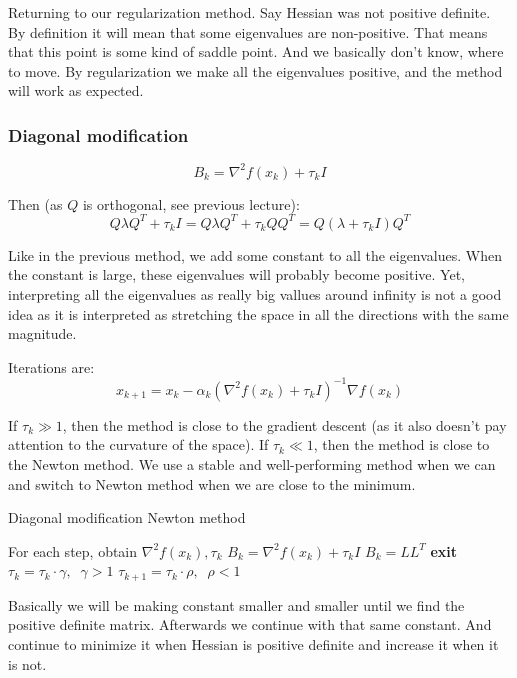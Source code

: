 Returning to our regularization method. Say Hessian was not positive definite. By definition it will mean that some eigenvalues are non-positive. That means that this point is some kind of saddle point. And we basically don't know, where to move. By regularization we make all the eigenvalues positive, and the method will work as expected.

\subsubsection{Diagonal modification}

\[
    B_k = \nabla^2 f(x_k) + \tau_k I 
\]

Then (as $Q$ is orthogonal, see previous lecture): 
\[ 
    Q \lambda Q^T + \tau_k I = Q \lambda Q^T + \tau_k Q Q^T = Q (\lambda + \tau_k I) Q^T
\]

Like in the previous method, we add some constant to all the eigenvalues. When the constant is large, these eigenvalues will probably become positive. Yet, interpreting all the eigenvalues as really big vallues around infinity is not a good idea as it is interpreted as stretching the space in all the directions with the same magnitude.

Iterations are:
\[
    x_{k+1} = x_k - \alpha_k (\nabla^2 f(x_k) + \tau_k I)^{-1} \nabla f(x_k)
\]

If $\tau_k \gg 1$, then the method is close to the gradient descent (as it also doesn't pay attention to the curvature of the space). If $\tau_k \ll 1$, then the method is close to the Newton method. We use a stable and well-performing method when we can and switch to Newton method when we are close to the minimum.

\begin{algorithm}
    \caption{Diagonal modification Newton method}
    \begin{algorithmic}[1]
    \State For each step, obtain $\nabla^2 f(x_k), \tau_k$
        \State $B_k = \nabla^2 f(x_k) + \tau_k I$
        \State $B_k = L L^T$
            \State \textbf{exit}
        \EndIf
        \State $\tau_k = \tau_k \cdot \gamma, \;\; \gamma > 1$
    \EndWhile
    \State $\tau_{k+1} = \tau_k \cdot \rho, \;\; \rho < 1$
\end{algorithmic}
\end{algorithm}

Basically we will be making constant smaller and smaller until we find the positive definite matrix. Afterwards we continue with that same constant. And continue to minimize it when Hessian is positive definite and increase it when it is not.

